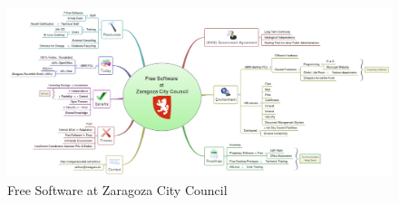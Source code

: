      \begin{figure}[H]
     \centering
         \includegraphics[scale=0.3,angle=90]{img/aytozgz.png} 
       \caption[Free Software at Zaragoza City Council]{Free Software at Zaragoza City Council \protect\footnotemark}
       \label{fig:FsZ}
         \end{figure}
     \newpage
